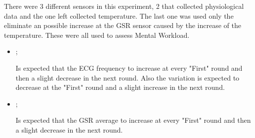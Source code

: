 There were 3 different sensors in this experiment, 2 that collected physiological data and the one left collected temperature. The last one was used only the eliminate an possible increase at the GSR sensor caused by the increase of the temperature. These were all used to assess Mental Workload.

\begin{itemize}
    \item {};
    
        Is expected that the ECG frequency to increase at every "First" round and then a slight decrease in the next round. Also the variation is expected to decrease at the "First" round and a slight increase in the next round.

    \item {};
    
        Is expected that the GSR average to increase at every "First" round and then a slight decrease in the next round.

\end{itemize}



